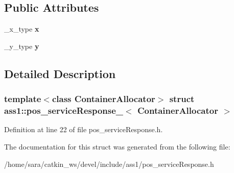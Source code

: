 \subsection*{Public Attributes}
\begin{DoxyCompactItemize}
\item 
\mbox{\label{structass1_1_1pos__serviceResponse___abf306e296e1ce847e79a1775641949fa}} 
\+\_\+x\+\_\+type {\bfseries x}
\item 
\mbox{\label{structass1_1_1pos__serviceResponse___ad633ed94a8b34cb712f90cd0aa4de07f}} 
\+\_\+y\+\_\+type {\bfseries y}
\end{DoxyCompactItemize}


\subsection{Detailed Description}
\subsubsection*{template$<$class Container\+Allocator$>$\newline
struct ass1\+::pos\+\_\+service\+Response\+\_\+$<$ Container\+Allocator $>$}



Definition at line 22 of file pos\+\_\+service\+Response.\+h.



The documentation for this struct was generated from the following file\+:\begin{DoxyCompactItemize}
\item 
/home/sara/catkin\+\_\+ws/devel/include/ass1/pos\+\_\+service\+Response.\+h\end{DoxyCompactItemize}
